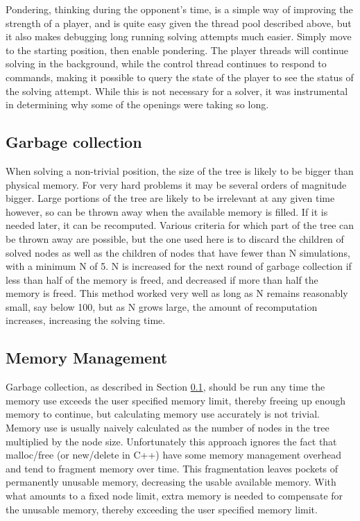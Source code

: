 Pondering, thinking during the opponent's time, is a simple way of improving the strength of a player, and is quite easy given the thread pool described above, but it also makes debugging long running solving attempts much easier. Simply move to the starting position, then enable pondering. The player threads will continue solving in the background, while the control thread continues to respond to commands, making it possible to query the state of the player to see the status of the solving attempt. While this is not necessary for a solver, it was instrumental in determining why some of the openings were taking so long.


\subsection{Garbage collection}\label{sec:gc}

When solving a non-trivial position, the size of the tree is likely to be bigger than physical memory. For very hard problems it may be several orders of magnitude bigger. Large portions of the tree are likely to be irrelevant at any given time however, so can be thrown away when the available memory is filled. If it is needed later, it can be recomputed. Various criteria for which part of the tree can be thrown away are possible, but the one used here is to discard the children of solved nodes as well as the children of nodes that have fewer than N simulations, with a minimum N of 5. N is increased for the next round of garbage collection if less than half of the memory is freed, and decreased if more than half the memory is freed. This method worked very well as long as N remains reasonably small, say below 100, but as N grows large, the amount of recomputation increases, increasing the solving time.


\subsection{Memory Management}

Garbage collection, as described in Section \ref{sec:gc}, should be run any time the memory use exceeds the user specified memory limit, thereby freeing up enough memory to continue, but calculating memory use accurately is not trivial. Memory use is usually naively calculated as the number of nodes in the tree multiplied by the node size. Unfortunately this approach ignores the fact that malloc/free (or new/delete in C++) have some memory management overhead and tend to fragment memory over time. This fragmentation leaves pockets of permanently unusable memory, decreasing the usable available memory. With what amounts to a fixed node limit, extra memory is needed to compensate for the unusable memory, thereby exceeding the user specified memory limit.

